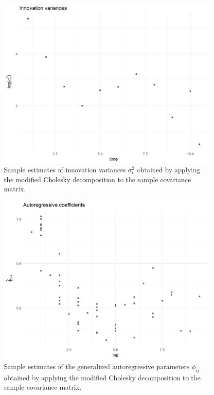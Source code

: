 \documentclass[12pt]{article}
\theoremstyle{definition}
\begin{document}
\begin{figure}[H] \label{fig:cattleA-innovation-variogram}
\begin{center}
    \includegraphics[width=\textwidth]{img/cattle/cattleA-innovation-variogram}
\end{center}
 \caption{Sample estimates of innovation variances $\sigma_t^2$ obtained by applying the modified Cholesky decomposition to the sample covariance matrix.}
 \end{figure}

\begin{figure}[H] \label{fig:cattleA-regressogram}
\begin{center}
\includegraphics[width = \textwidth]{img/cattle/cattleA-regressogram}
\end{center}
 \caption{Sample estimates of the generalized autoregressive parameters $\phi_{ij}$ obtained by applying the modified Cholesky decomposition to the sample covariance matrix.}
\end{figure} 
\end{document}

